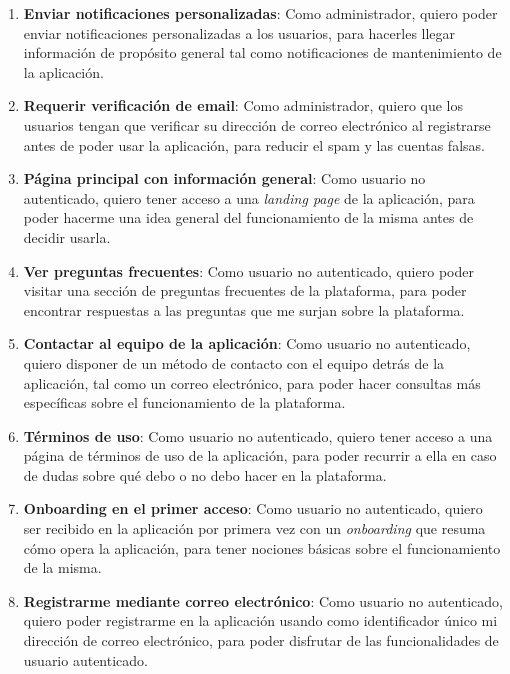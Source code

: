 \begin{enumerate}[label=HU-\protect\twodigits{\arabic*}:, align=left, leftmargin=*]
\item \textbf{Enviar notificaciones personalizadas}: Como administrador, quiero poder enviar notificaciones personalizadas a los usuarios, para hacerles llegar información de propósito general tal como notificaciones de mantenimiento de la aplicación.

\item \textbf{Requerir verificación de email}: Como administrador, quiero que los usuarios tengan que verificar su dirección de correo electrónico al registrarse antes de poder usar la aplicación, para reducir el spam y las cuentas falsas.


\item \textbf{Página principal con información general}: Como usuario no autenticado, quiero tener acceso a una \textit{landing page} de la aplicación, para poder hacerme una idea general del funcionamiento de la misma antes de decidir usarla.

\item \textbf{Ver preguntas frecuentes}: Como usuario no autenticado, quiero poder visitar una sección de preguntas frecuentes de la plataforma, para poder encontrar respuestas a las preguntas que me surjan sobre la plataforma.

\item \textbf{Contactar al equipo de la aplicación}: Como usuario no autenticado, quiero disponer de un método de contacto con el equipo detrás de la aplicación, tal como un correo electrónico, para poder hacer consultas más específicas sobre el funcionamiento de la plataforma.

\item \textbf{Términos de uso}: Como usuario no autenticado, quiero tener acceso a una página de términos de uso de la aplicación, para poder recurrir a ella en caso de dudas sobre qué debo o no debo hacer en la plataforma.

\item \textbf{Onboarding en el primer acceso}: Como usuario no autenticado, quiero ser recibido en la aplicación por primera vez con un \textit{onboarding} que resuma cómo opera la aplicación, para tener nociones básicas sobre el funcionamiento de la misma.

\item \textbf{Registrarme mediante correo electrónico}: Como usuario no autenticado, quiero poder registrarme en la aplicación usando como identificador único mi dirección de correo electrónico, para poder disfrutar de las funcionalidades de usuario autenticado.


\end{enumerate}
